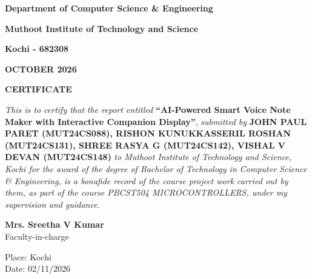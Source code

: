 \documentclass[a4paper,12pt,oneside]{report}
\begin{document}
\begin{titlepage}
\vspace{0.5cm}

{\bfseries Department of Computer Science \& Engineering\par}
{\bfseries Muthoot Institute of Technology and Science\par}
{\bfseries Kochi - 682308\par}

\vspace{0.5cm}
{\bfseries OCTOBER 2026\par}

\end{titlepage}

\begin{titlepage}

\vspace{1.5cm}

\begin{center}
{\scshape\Large\bfseries CERTIFICATE\par}
\end{center}

\vspace{1cm}

\noindent
\textit{This is to certify that the report entitled}
\textbf{``AI-Powered Smart Voice Note Maker with Interactive Companion Display''},
\textit{submitted by}
\textbf{JOHN PAUL PARET
(MUT24CS088), RISHON KUNUKKASSERIL ROSHAN (MUT24CS131), SHREE RASYA G (MUT24CS142), VISHAL V DEVAN (MUT24CS148)}
\textit{to Muthoot Institute of Technology and Science, Kochi for the award of the degree of Bachelor of Technology in Computer Science \& Engineering, is a bonafide record of the course project work carried out by them, as part of the course PBCST504 MICROCONTROLLERS, under my supervision and guidance.}

\vspace{2.5cm}

\noindent
\textbf{Mrs. Sreetha V Kumar}\\
Faculty-in-charge

\vspace{3cm}

\noindent Place: Kochi\\
Date: 02/11/2026

\end{titlepage}

\newpage
{}
\setcounter{page}{2}
\thispagestyle{plain}
\end{document}

